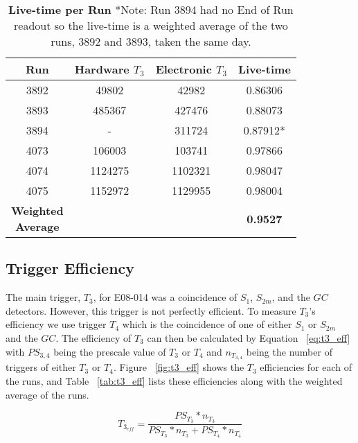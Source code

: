 \begin{table}[!h]
\centering
\begin{tabular}{|c c c c|}
\hline
\textbf{Run} & \makecell{\textbf{Hardware}\\ \textbf{$T_3$}} & \makecell{\textbf{Electronic}\\ \textbf{$T_3$}} & \textbf{Live-time}\\
\hline
3892 & 49802 & 42982 & 0.86306 \\
3893 & 485367 & 427476 & 0.88073 \\
3894 & - & 311724 & 0.87912* \\
4073 & 106003 & 103741 & 0.97866 \\
4074 & 1124275 & 1102321 & 0.98047 \\
4075 & 1152972 & 1129955 & 0.98004 \\  
\hline
\makecell{\textbf{Weighted}\\ \textbf{Average}} &  &  & \textbf{0.9527} \\
\hline
\end{tabular}
\caption{{\bf{Live-time per Run}} *Note: Run 3894 had no End of Run readout so the live-time is a weighted average of the two runs, 3892 and 3893, taken the same day.}
\label{tab:dead-time}
\end{table}

\subsection{Trigger Efficiency}
\label{ssec:trigger_eff}

The main trigger, $T_3$, for E08-014 was a coincidence of $S_1$, $S_{2m}$, and the $GC$ detectors. However, this trigger is not perfectly efficient. To measure $T_3$'s efficiency we use trigger $T_4$ which is the coincidence of one of either $S_1$ or $S_{2m}$ and the $GC$. The efficiency of $T_3$ can then be calculated by Equation ~\ref{eq:t3_eff} with $PS_{3,4}$ being the prescale value of $T_3$ or $T_4$ and $n_{T_{3,4}}$ being the number of triggers of either $T_3$ or $T_4$. Figure ~\ref{fig:t3_eff} shows the $T_3$ efficiencies for each of the runs, and Table ~\ref{tab:t3_eff} lists these efficiencies along with the weighted average of the runs. 

\begin{equation} \label{eq:t3_eff}
	T_{3_{eff}} = \frac{PS_{T_3}*n_{T_3}}{PS_{T_3}*n_{T_3}+PS_{T_4}*n_{T_4}}
\end{equation}

